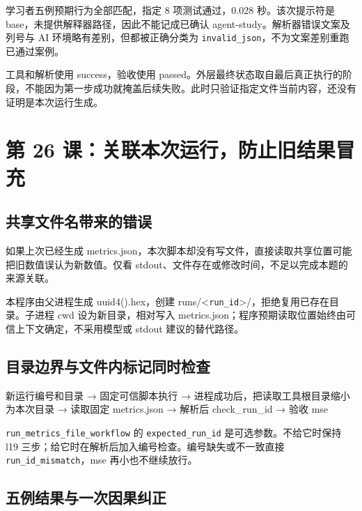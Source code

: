 \documentclass[UTF8,zihao=-4,fontset=fandol]{ctexart}
\begin{document}
学习者五例预期行为全部匹配，指定 8 项测试通过，0.028 秒。该次提示符是 base，未提供解释器路径，因此不能记成已确认 agent-study。解析器错误文案及列号与 AI 环境略有差别，但都被正确分类为 \nolinkurl{invalid_json}，不为文案差别重跑已通过案例。

工具和解析使用 success，验收使用 passed。外层最终状态取自最后真正执行的阶段，不能因为第一步成功就掩盖后续失败。此时只验证指定文件当前内容，还没有证明是本次运行生成。

\section{第 26 课：关联本次运行，防止旧结果冒充}

\subsection{共享文件名带来的错误}

如果上次已经生成 metrics.json，本次脚本却没有写文件，直接读取共享位置可能把旧数值误认为新数值。仅看 stdout、文件存在或修改时间，不足以完成本题的来源关联。

本程序由父进程生成 uuid4().hex，创建 runs/<\nolinkurl{run_id}>/，拒绝复用已存在目录。子进程 cwd 设为新目录，相对写入 metrics.json；程序预期读取位置始终由可信上下文确定，不采用模型或 stdout 建议的替代路径。

\subsection{目录边界与文件内标记同时检查}

\begin{Code}
新运行编号和目录
  → 固定可信脚本执行
  → 进程成功后，把读取工具根目录缩小为本次目录
  → 读取固定 metrics.json
  → 解析后 check_run_id
  → 验收 mse
\end{Code}

\nolinkurl{run_metrics_file_workflow} 的 \nolinkurl{expected_run_id} 是可选参数。不给它时保持 l19 三步；给它时在解析后加入编号检查。编号缺失或不一致直接 \nolinkurl{run_id_mismatch}，mse 再小也不继续放行。

\subsection{五例结果与一次因果纠正}
\end{document}
